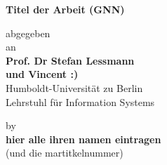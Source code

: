 
    \begin{center}
        
    
    {\Large{\bf Titel der Arbeit (GNN)}} \vspace{0.5cm}


    {\normalsize abgegeben \\\vspace{0.5cm}
    an}\\\vspace{0.5cm}
    {\normalsize{\bf Prof. Dr Stefan Lessmann}}\\
    {\normalsize{\bf und Vincent :) }}
    \\\vspace{0.5cm}
    {\normalsize Humboldt-Universit\"at zu Berlin \\
    Lehrstuhl für Information Systems}


    {\normalsize by \\\vspace{0.5cm}
    {\bf hier alle ihren namen eintragen} \\
    (und die martitkelnummer)} \vspace{1cm}

    \end{center}



